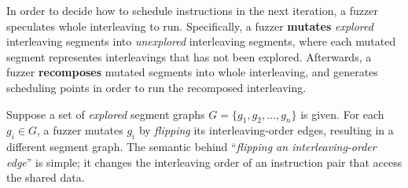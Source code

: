In order to decide how to schedule instructions in the next iteration,
a fuzzer speculates whole interleaving to run.
%
Specifically, a fuzzer \textbf{mutates} \textit{explored} interleaving
segments into \textit{unexplored} interleaving segments, where each
mutated segment representes interleavings that has not been explored.
%
Afterwards, a fuzzer \textbf{recomposes} mutated segments into whole
interleaving, and generates scheduling points in order to run the
recomposed interleaving.
%

%
%


%
Suppose a set of \textit{explored} segment graphs
$G = \{g_1, g_2, ..., g_n \}$ is given.
%
For each $g_i \in G$, a fuzzer mutates $g_i$ by \textit{flipping} its
interleaving-order edges, resulting in a different segment graph.
%
The semantic behind ``\textit{flipping an interleaving-order edge}''
is simple; it changes the interleaving order of an instruction pair
that access the shared data.




